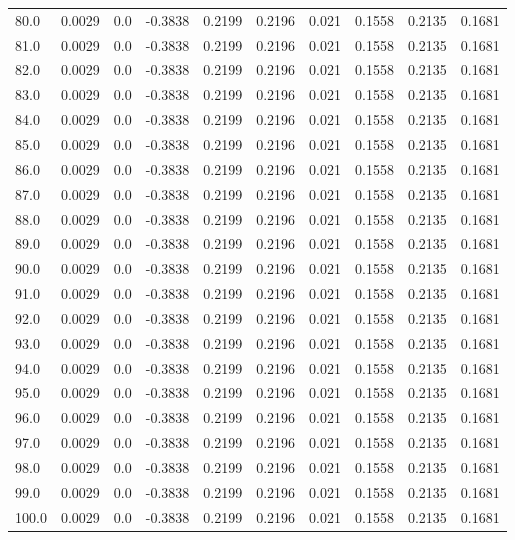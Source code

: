 \begin{longtable}{lrrrrrrrrr}
80.0 & 0.0029 & 0.0 & -0.3838 & 0.2199 & 0.2196 & 0.021 & 0.1558 & 0.2135 & 0.1681 \\
81.0 & 0.0029 & 0.0 & -0.3838 & 0.2199 & 0.2196 & 0.021 & 0.1558 & 0.2135 & 0.1681 \\
82.0 & 0.0029 & 0.0 & -0.3838 & 0.2199 & 0.2196 & 0.021 & 0.1558 & 0.2135 & 0.1681 \\
83.0 & 0.0029 & 0.0 & -0.3838 & 0.2199 & 0.2196 & 0.021 & 0.1558 & 0.2135 & 0.1681 \\
84.0 & 0.0029 & 0.0 & -0.3838 & 0.2199 & 0.2196 & 0.021 & 0.1558 & 0.2135 & 0.1681 \\
85.0 & 0.0029 & 0.0 & -0.3838 & 0.2199 & 0.2196 & 0.021 & 0.1558 & 0.2135 & 0.1681 \\
86.0 & 0.0029 & 0.0 & -0.3838 & 0.2199 & 0.2196 & 0.021 & 0.1558 & 0.2135 & 0.1681 \\
87.0 & 0.0029 & 0.0 & -0.3838 & 0.2199 & 0.2196 & 0.021 & 0.1558 & 0.2135 & 0.1681 \\
88.0 & 0.0029 & 0.0 & -0.3838 & 0.2199 & 0.2196 & 0.021 & 0.1558 & 0.2135 & 0.1681 \\
89.0 & 0.0029 & 0.0 & -0.3838 & 0.2199 & 0.2196 & 0.021 & 0.1558 & 0.2135 & 0.1681 \\
90.0 & 0.0029 & 0.0 & -0.3838 & 0.2199 & 0.2196 & 0.021 & 0.1558 & 0.2135 & 0.1681 \\
91.0 & 0.0029 & 0.0 & -0.3838 & 0.2199 & 0.2196 & 0.021 & 0.1558 & 0.2135 & 0.1681 \\
92.0 & 0.0029 & 0.0 & -0.3838 & 0.2199 & 0.2196 & 0.021 & 0.1558 & 0.2135 & 0.1681 \\
93.0 & 0.0029 & 0.0 & -0.3838 & 0.2199 & 0.2196 & 0.021 & 0.1558 & 0.2135 & 0.1681 \\
94.0 & 0.0029 & 0.0 & -0.3838 & 0.2199 & 0.2196 & 0.021 & 0.1558 & 0.2135 & 0.1681 \\
95.0 & 0.0029 & 0.0 & -0.3838 & 0.2199 & 0.2196 & 0.021 & 0.1558 & 0.2135 & 0.1681 \\
96.0 & 0.0029 & 0.0 & -0.3838 & 0.2199 & 0.2196 & 0.021 & 0.1558 & 0.2135 & 0.1681 \\
97.0 & 0.0029 & 0.0 & -0.3838 & 0.2199 & 0.2196 & 0.021 & 0.1558 & 0.2135 & 0.1681 \\
98.0 & 0.0029 & 0.0 & -0.3838 & 0.2199 & 0.2196 & 0.021 & 0.1558 & 0.2135 & 0.1681 \\
99.0 & 0.0029 & 0.0 & -0.3838 & 0.2199 & 0.2196 & 0.021 & 0.1558 & 0.2135 & 0.1681 \\
100.0 & 0.0029 & 0.0 & -0.3838 & 0.2199 & 0.2196 & 0.021 & 0.1558 & 0.2135 & 0.1681 \\

\end{longtable}
